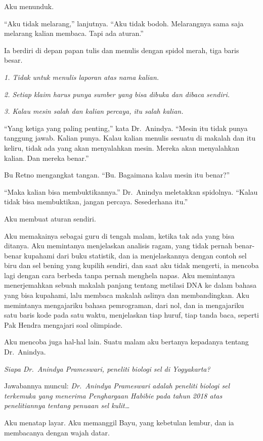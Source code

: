 \documentclass[11pt,twoside,openany]{book}
\makeatletter
\newcommand{\scenebreak}{\par\vspace{0.9em}{\centering\textsc{*\hspace{0.7em}*\hspace{0.7em}*}\par}\vspace{0.9em}\@afterindentfalse\@afterheading}
\makeatother
\begin{document}
Aku menunduk.

``Aku tidak melarang,'' lanjutnya. ``Aku tidak bodoh. Melarangnya sama saja melarang kalian membaca. Tapi ada aturan.''

Ia berdiri di depan papan tulis dan menulis dengan spidol merah, tiga baris besar.

\emph{1. Tidak untuk menulis laporan atas nama kalian.}

\emph{2. Setiap klaim harus punya sumber yang bisa dibuka dan dibaca sendiri.}

\emph{3. Kalau mesin salah dan kalian percaya, itu salah kalian.}

``Yang ketiga yang paling penting,'' kata Dr.~Anindya. ``Mesin itu tidak punya tanggung jawab. Kalian punya. Kalau kalian menulis sesuatu di makalah dan itu keliru, tidak ada yang akan menyalahkan mesin. Mereka akan menyalahkan kalian. Dan mereka benar.''

Bu Retno mengangkat tangan. ``Bu. Bagaimana kalau mesin itu benar?''

``Maka kalian bisa membuktikannya.'' Dr.~Anindya meletakkan spidolnya. ``Kalau tidak bisa membuktikan, jangan percaya. Sesederhana itu.''

\scenebreak
Aku membuat aturan sendiri.

Aku memakainya sebagai guru di tengah malam, ketika tak ada yang bisa ditanya. Aku memintanya menjelaskan analisis ragam, yang tidak pernah benar-benar kupahami dari buku statistik, dan ia menjelaskannya dengan contoh sel biru dan sel bening yang kupilih sendiri, dan saat aku tidak mengerti, ia mencoba lagi dengan cara berbeda tanpa pernah menghela napas. Aku memintanya menerjemahkan sebuah makalah panjang tentang metilasi DNA ke dalam bahasa yang bisa kupahami, lalu membaca makalah aslinya dan membandingkan. Aku memintanya mengajariku bahasa pemrograman, dari nol, dan ia mengajariku satu baris kode pada satu waktu, menjelaskan tiap huruf, tiap tanda baca, seperti Pak Hendra mengajari soal olimpiade.

Aku mencoba juga hal-hal lain. Suatu malam aku bertanya kepadanya tentang Dr.~Anindya.

\emph{Siapa Dr.~Anindya Prameswari, peneliti biologi sel di Yogyakarta?}

Jawabannya muncul: \emph{Dr.~Anindya Prameswari adalah peneliti biologi sel terkemuka yang menerima Penghargaan Habibie pada tahun 2018 atas penelitiannya tentang penuaan sel kulit\ldots{}}

Aku menatap layar. Aku memanggil Bayu, yang kebetulan lembur, dan ia membacanya dengan wajah datar.
\end{document}
